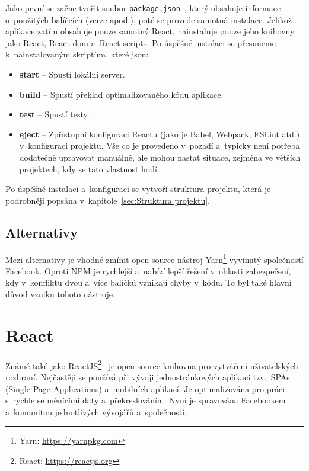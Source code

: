 Jako první se začne tvořit soubor \texttt{package.json}~\cite{website:WhatDoesCreate-React-AppActuallyDo}, který obsahuje informace o~použitých balíčcích (verze apod.), poté se provede samotná instalace. Jelikož aplikace zatím obsahuje pouze samotný React, nainstaluje pouze jeho knihovny jako React, React-dom a~React-scripts. Po úspěšné instalaci se přesuneme k~nainstalovaným skriptům, které jsou:
\begin{itemize}
    \item \textbf{start} -- Spustí lokální server.
    \item \textbf{build} -- Spustí překlad optimalizovaného kódu aplikace.
    \item \textbf{test} -- Spustí testy.
    \item \textbf{eject} -- Zpřístupní konfiguraci Reactu (jako je Babel, Webpack, ESLint atd.) v~konfiguraci projektu. Vše co je provedeno v~pozadí a~typicky není potřeba dodatečně upravovat manuálně, ale mohou nastat situace, zejména ve větších projektech, kdy se tato vlastnost hodí.
\end{itemize}

Po úspěšné instalaci a~konfiguraci se vytvoří struktura projektu, která je podrobněji popsána v~kapitole~\ref{sec:Struktura projektu}.

\subsection*{Alternativy}
Mezi alternativy je vhodné zmínit open-source nástroj Yarn\footnote{Yarn: \url{https://yarnpkg.com}} vyvinutý společností Facebook. Oproti NPM je rychlejší a~nabízí lepší řešení v~oblasti zabezpečení, kdy v~konfliktu dvou a~více balíčků vznikají chyby v~kódu. To byl také hlavní důvod vzniku tohoto nástroje.

\section{React}
\label{sec:React}
Známé také jako ReactJS\footnote{React: \url{https://reactjs.org}}~\cite{website:EverythingReact} je open-source knihovna pro vytváření uživatelských rozhraní. Nejčastěji se používá při vývoji jednostránkových aplikací tzv.~SPAs (Single Page Applications) a~mobilních aplikací. Je optimalizována pro práci s~rychle se měnícími daty a~překreslováním. Nyní je spravována Facebookem a~komunitou jednotlivých vývojářů a~společností.

